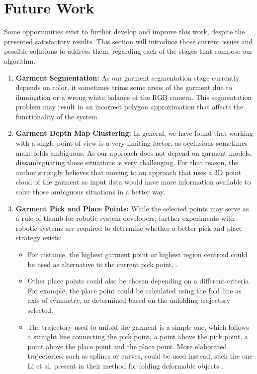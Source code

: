 \section{Future Work}
\label{conclusions:future_work}
Some opportunities exist to further develop and improve this work, despite the presented satisfactory results. This section will introduce those current issues and possible solutions to address them, regarding each of the stages that compose our algorithm.

\begin{enumerate}
	\item \textbf{Garment Segmentation:} As our garment segmentation stage currently depends on color, it sometimes trims some areas of the garment due to ilumination or a wrong white balance of the RGB camera. This segmentation problem may result in an incorrect polygon approximation that affects the functionality of the system.
	\item \textbf{Garment Depth Map Clustering:} In general, we have found that working with a single point of view is a very limiting factor, as occlusions sometimes make folds ambiguous. As our approach does not depend on garment models, dissambiguating those situations is very challenging. For that reason, the author strongly believes that moving to an approach that uses a 3D point cloud of the garment as input data would have more information available to solve those ambiguous situations in a better way.

	\item \textbf{Garment Pick and Place Points:} While the selected points may serve as a rule-of-thumb for robotic system developers, further experiments with robotic systems are required to determine whether a better pick and place strategy exists: 
	
\begin{itemize}
\item For instance, the highest garment point or highest region centroid could be used as alternative to the current pick point, .

\item Other place points could also be chosen depending on a different criteria. For example, the place point could be calculated using the fold line as axis of symmetry, or determined based on the unfolding trajectory selected.	

\item The trajectory used to unfold the garment is a simple one, which follows a straight line connecting the pick point, a point above the pick point, a point above the place point and the place point. More elaborated trajectories, such as splines or curves, could be used instead, such the one Li et al. present in their method for folding deformable objects \cite{Li2015IROS}.

\end{itemize}
\end{enumerate}

